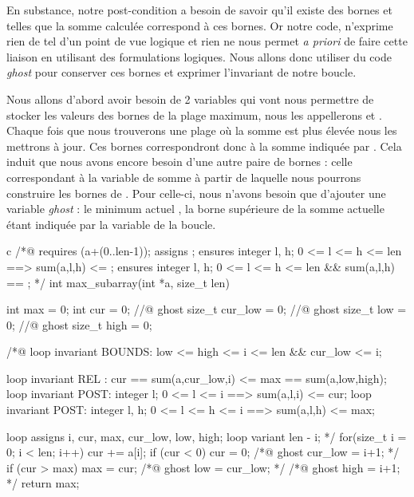 \documentclass[middle]{zmdocument}
\begin{document}
En substance, notre post-condition a besoin de savoir qu'il existe des 
bornes  et  telles que la somme calculée correspond à ces bornes. 
Or notre code, n'exprime rien de tel d'un point de vue logique et rien ne nous 
permet \textit{a priori} de faire cette liaison en utilisant des formulations logiques.
Nous allons donc utiliser du code \textit{ghost} pour conserver ces bornes et exprimer 
l'invariant de notre boucle.



Nous allons d'abord avoir besoin de 2 variables qui vont nous permettre de stocker
les valeurs des bornes de la plage maximum, nous les appellerons  
et . Chaque fois que nous trouverons une plage où la somme est plus 
élevée nous les mettrons à jour. Ces bornes correspondront donc à la somme indiquée
par . Cela induit que nous avons encore besoin d'une autre paire de 
bornes : celle correspondant à la variable de somme  à partir de laquelle 
nous pourrons construire les bornes de . Pour celle-ci, nous n'avons 
besoin que d'ajouter une variable \textit{ghost} : le minimum actuel , la 
borne supérieure de la somme actuelle étant indiquée par la variable  de la 
boucle.



\begin{CodeBlock}{c}
/*@ 
  requires \valid(a+(0..len-1));
  assigns \nothing;
  ensures \forall integer l, h;  0 <= l <= h <= len ==> sum(a,l,h) <= \result;
  ensures \exists integer l, h;  0 <= l <= h <= len &&  sum(a,l,h) == \result;
*/
int max_subarray(int *a, size_t len) {
  int max = 0;
  int cur = 0;
  //@ ghost size_t cur_low = 0; 
  //@ ghost size_t low = 0;
  //@ ghost size_t high = 0; 

  /*@ 
    loop invariant BOUNDS: low <= high <= i <= len && cur_low <= i;
    
    loop invariant REL :   cur == sum(a,cur_low,i) <= max == sum(a,low,high);
    loop invariant POST:   \forall integer l;    0 <= l <= i      ==> sum(a,l,i) <= cur;
    loop invariant POST:   \forall integer l, h; 0 <= l <= h <= i ==> sum(a,l,h) <= max;
   
    loop assigns i, cur, max, cur_low, low, high;
    loop variant len - i; 
  */
  for(size_t i = 0; i < len; i++) {
    cur += a[i];
    if (cur < 0) {
      cur = 0;
      /*@ ghost cur_low = i+1; */
    }
    if (cur > max) {
      max = cur;
      /*@ ghost low = cur_low; */
      /*@ ghost high = i+1; */
    }
  }
  return max;
}
\end{CodeBlock}
\end{document}
